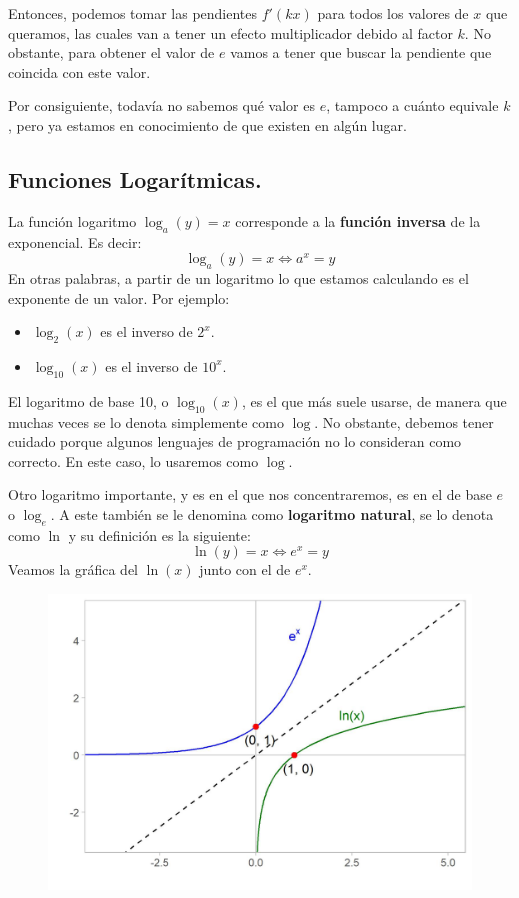 \documentclass[12pt]{article}
\begin{document}
Entonces, podemos tomar las pendientes $f'(kx)$ para todos los valores de $x$ que queramos, las cuales van a tener un efecto multiplicador debido al factor $k$. No obstante, para obtener el valor de $e$ vamos a tener que buscar la pendiente que coincida con este valor.

Por consiguiente, todavía no sabemos qué valor es $e$, tampoco a cuánto equivale $k$, pero ya estamos en conocimiento de que existen en algún lugar.




\subsection{Funciones Logarítmicas.}

La función logaritmo $\log_{a}(y) = x$ corresponde a la \textbf{función inversa} de la exponencial. Es decir:
\[\log_{a}(y) = x \iff a^{x} = y\]
En otras palabras, a partir de un logaritmo lo que estamos calculando es el exponente de un valor. Por ejemplo:

\begin{itemize}
\item $\log_{2}(x)$ es el inverso de $2^{x}$.
\item $\log_{10}(x)$ es el inverso de $10^{x}$.
\end{itemize}

El logaritmo de base 10, o $\log_{10}(x)$, es el que más suele usarse, de manera que muchas veces se lo denota simplemente como $\log$. No obstante, debemos tener cuidado porque algunos lenguajes de programación no lo consideran como correcto. En este caso, lo usaremos como $\log$.

Otro logaritmo importante, y es en el que nos concentraremos, es en el de base $e$ o $\log_{e}$. A este también se le denomina como \textbf{logaritmo natural}, se lo denota como $\ln$ y su definición es la siguiente:
\[\ln(y) = x \iff e^{x} = y\]
Veamos la gráfica del $\ln(x)$ junto con el de $e^{x}$.

\begin{figure}[hbt!]
\centering
\includegraphics[scale=0.7]{img/ln_e_plots.jpg}
\end{figure}
\end{document}
